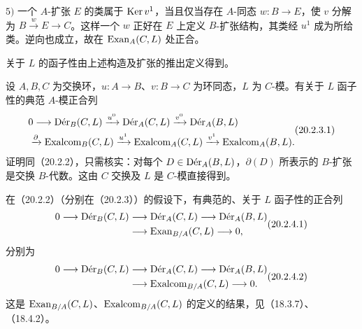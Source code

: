 $5)$ 一个 $A$-扩张 $E$ 的类属于 $\Ker v^1$，当且仅当存在 $A$-同态 $w:B\to E$，使 $v$ 分解为 $B\xrightarrow{w}E\to C$。这样一个 $w$ 正好在 $E$ 上定义 $B$-扩张结构，其类经 $u^1$ 成为所给类。逆向也成立，故在 $\Exan_A(C,L)$ 处正合。

关于 $L$ 的函子性由上述构造及扩张的推出定义得到。

设 $A,B,C$ 为交换环，$u:A\to B$、$v:B\to C$ 为环同态，$L$ 为 $C$-模。有关于 $L$ 函子性的典范 $A$-模正合列
\begin{equation}
\begin{aligned}
 &0\longrightarrow\Der_B(C,L)\xrightarrow{u^0}\Der_A(C,L)\xrightarrow{v^0}\Der_A(B,L)\\
 &\qquad\xrightarrow{\partial}\Exalcom_B(C,L)\xrightarrow{u^1}\Exalcom_A(C,L)
 \xrightarrow{v^1}\Exalcom_A(B,L).
\end{aligned}
\tag{20.2.3.1}
\end{equation}
证明同（20.2.2），只需核实：对每个 $D\in\Der_A(B,L)$，$\partial(D)$ 所表示的 $B$-扩张是交换 $B$-代数。这由 $C$ 交换及 $L$ 是 $C$-模直接得到。

在（20.2.2）（分别在（20.2.3））的假设下，有典范的、关于 $L$ 函子性的正合列
\begin{equation}
\begin{aligned}
0\longrightarrow\Der_B(C,L)&\longrightarrow\Der_A(C,L)
\longrightarrow\Der_A(B,L)\\
&\longrightarrow\Exan_{B/A}(C,L)\longrightarrow0,
\end{aligned}
\tag{20.2.4.1}
\end{equation}
分别为
\begin{equation}
\begin{aligned}
0\longrightarrow\Der_B(C,L)&\longrightarrow\Der_A(C,L)
\longrightarrow\Der_A(B,L)\\
&\longrightarrow\Exalcom_{B/A}(C,L)\longrightarrow0.
\end{aligned}
\tag{20.2.4.2}
\end{equation}
这是 $\Exan_{B/A}(C,L)$、$\Exalcom_{B/A}(C,L)$ 的定义的结果，见（18.3.7）、（18.4.2）。

